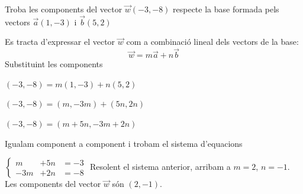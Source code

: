 \begin{resolt}{Troba les components del vector $\vec w(-3,-8)$ respecte la base formada pels vectors $\vec a(1,-3)$ i $\vec b(5,2)$}
	
	Es tracta d'expressar el vector $\vec w$ com a combinació lineal dels vectors de la base:
	\begin{equation*}
		\vec w = m \vec a + n \vec b
	\end{equation*}
	Substituint les components
	
	$(-3,-8)=m(1,-3)+n(5,2)$
	
	$(-3,-8)=(m,-3m)+(5n,2n)$
	
	$(-3,-8)=(m+5n,-3m+2n)$
	
	Igualam component a component i trobam el sistema d'equacions
	
	$\left\{\begin{array}{lll}
	m &+5n &=-3 \\
	-3m&+2n&=-8
	\end{array}\right.$
	Resolent el sistema anterior, arribam \linebreak a $m=2$, $n=-1$. Les components del vector $\vec w$ són $(2,-1)$.
\end{resolt}


